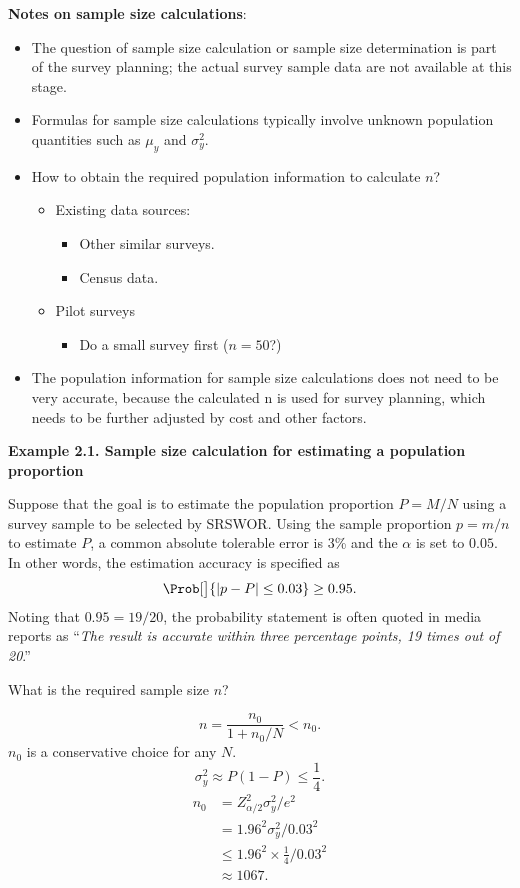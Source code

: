 \textbf{Notes on sample size calculations}:
\begin{itemize}
      \item The question of sample size calculation or sample size
            determination is part of the survey planning; the actual survey
            sample data are not available at this stage.
      \item Formulas for sample size calculations typically involve unknown
            population quantities such as $ \mu_y $ and $ \sigma_y^2 $.
      \item How to obtain the required population information to calculate
            $n$?
            \begin{itemize}
                  \item Existing data sources:
                        \begin{itemize}
                              \item Other similar surveys.
                              \item Census data.
                        \end{itemize}
                  \item Pilot surveys
                        \begin{itemize}
                              \item Do a small survey first ($ n=50 $?)
                        \end{itemize}
            \end{itemize}
      \item The population information for sample size calculations does not
            need to be very accurate, because the calculated n is used for
            survey planning, which needs to be further adjusted by cost and
            other factors.
\end{itemize}

\textbf{Example 2.1. Sample size calculation for estimating a population proportion}

Suppose that the goal is to estimate the population proportion $ P=M/N $
using a survey sample to be selected by SRSWOR\@. Using the sample proportion $ p=m/n $
to estimate $ P $, a common absolute tolerable error is 3\% and the $ \alpha $ is set to $0.05$. In other words,
the estimation accuracy is specified as
\[ \Prob[\big]{\abs{p-P}\le 0.03}\ge 0.95. \]
Noting that $ 0.95=19/20 $, the probability statement is often quoted in media reports as
``\emph{The result is accurate within three percentage points, 19 times out of 20}.''

What is the required sample size $ n $?

\[ n=\frac{n_0}{1+n_0/N}<n_0. \]
$ n_0 $ is a conservative choice for any $ N $.
\[ \sigma_y^2\approx P(1-P)\le \frac{1}{4}. \]
\begin{align*}
      n_0
       & =Z_{\alpha/2}^2\sigma_y^2/e^2       \\
       & =1.96^2\sigma_y^2/0.03^2            \\
       & \le 1.96^2\times \frac{1}{4}/0.03^2 \\
       & \approx 1067.
\end{align*}
